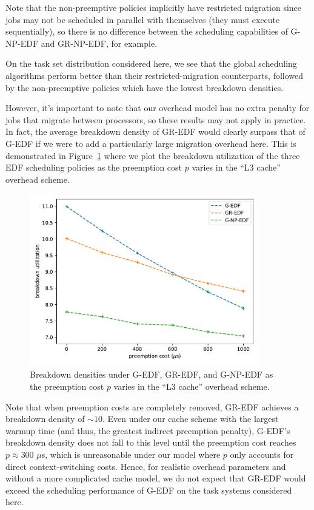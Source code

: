\documentclass[11pt]{article}
\newcommand{\figref}[1]{Figure~\ref{#1}}
\begin{document}
Note that the non-preemptive policies implicitly have restricted migration since jobs may not be scheduled in parallel with themselves (they must execute sequentially), so there is no difference between the scheduling capabilities of G-NP-EDF and GR-NP-EDF, for example.

On the task set distribution considered here, we see that the global scheduling algorithms perform better than their restricted-migration counterparts, followed by the non-preemptive policies which have the lowest breakdown densities.

However, it's important to note that our overhead model has no extra penalty for jobs that migrate between processors, so these results may not apply in practice. In fact, the average breakdown density of GR-EDF would clearly surpass that of G-EDF if we were to add a particularly large migration overhead here. This is demonstrated in \figref{fig:multiprocessor_preemption_experiment} where we plot the breakdown utilization of the three EDF scheduling policies as the preemption cost $p$ varies in the ``L3 cache'' overhead scheme.

\begin{figure}
	\centering
	\includegraphics[width=10cm]{multiprocessor_preemption.pdf}
	\caption{Breakdown densities under G-EDF, GR-EDF, and G-NP-EDF as the preemption cost $p$ varies in the ``L3 cache'' overhead scheme.}
	\label{fig:multiprocessor_preemption_experiment}
\end{figure}

Note that when preemption costs are completely removed, GR-EDF achieves a breakdown density of ${\sim}10$. Even under our cache scheme with the largest warmup time (and thus, the greatest indirect preemption penalty), G-EDF's breakdown density does not fall to this level until the preemption cost reaches $p\approx 300$ $\mu$s, which is unreasonable under our model where $p$ only accounts for direct context-switching costs. Hence, for realistic overhead parameters and without a more complicated cache model, we do not expect that GR-EDF would exceed the scheduling performance of G-EDF on the task systems considered here.
\end{document}
